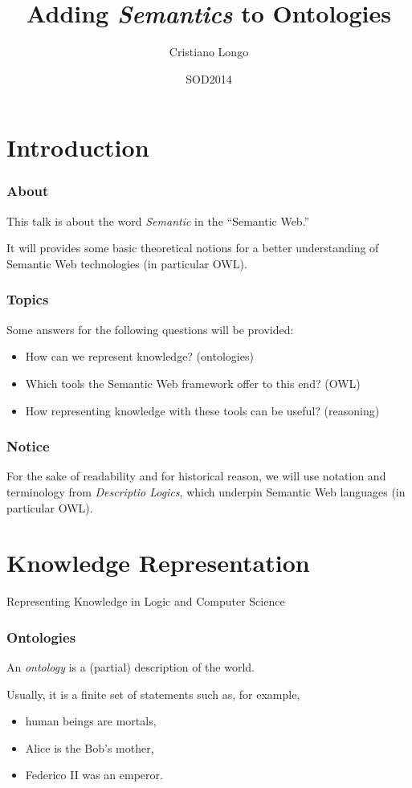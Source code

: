\documentclass[8pt]{beamer}
\title{Adding \emph{Semantics} to Ontologies}
\author{Cristiano Longo}
\institute{Dipartimento di Matematica e Informatica, Universit\`a di Catania, Italy \\
\url{mailto://longo@dmi.unict.it}
}
\date{SOD2014}
\begin{document}
\maketitle
\setcounter{tocdepth}{1}

\section{Introduction}

\begin{frame}
\frametitle{About}

This talk is about the word \emph{Semantic} in the ``Semantic Web.''
\vspace{\baselineskip}

It will provides some basic theoretical notions for a better
understanding of Semantic Web technologies (in particular OWL).
\end{frame}

\begin{frame}
\frametitle{Topics}

Some answers for the following questions will be provided:
\begin{itemize}[<+->]
 \item How can we represent knowledge? (ontologies)
 \item Which tools the Semantic Web framework offer to this end? (OWL)
 \item How representing knowledge with these tools can be useful? (reasoning)
\end{itemize}
\end{frame}

\begin{frame}
\frametitle{Notice}
  For the sake of readability and for historical reason, we will use
  notation and terminology from \emph{Descriptio Logics}, which
  underpin Semantic Web languages (in particular OWL). 
\end{frame}

\section{Knowledge Representation}

\begin{frame}
 \Large{Representing Knowledge in Logic and Computer Science}
\end{frame}


\begin{frame}
\frametitle{Ontologies}
  An \emph{ontology} is a (partial) description of the world.
  \vspace{\baselineskip}
  
  Usually, it is a finite set of statements such as, for example,
  \begin{itemize}
   \item human beings are mortals,
   \item Alice is the Bob's mother,
   \item Federico II was an emperor.
  \end{itemize}
\end{frame}
\end{document}
